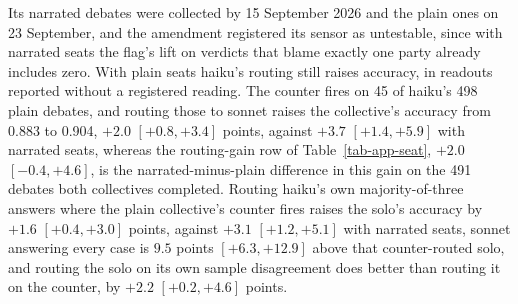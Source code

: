 Its narrated debates were collected by 15 September 2026 and the plain ones
on 23 September, and the amendment registered its sensor as untestable, since
with narrated seats the flag's lift on verdicts that blame exactly one party
already includes zero.
With plain seats haiku's routing still raises accuracy, in readouts reported
without a registered reading. The counter fires on 45 of haiku's 498 plain
debates, and routing those to sonnet raises the collective's accuracy from
0.883 to 0.904, $+2.0$ $[+0.8, +3.4]$ points, against $+3.7$
$[+1.4, +5.9]$ with narrated seats, whereas the routing-gain row of
Table~\ref{tab-app-seat}, $+2.0$ $[-0.4, +4.6]$, is the narrated-minus-plain
difference in this gain on the 491 debates both collectives completed.
Routing haiku's own majority-of-three answers where the plain collective's
counter fires raises the solo's accuracy by $+1.6$ $[+0.4, +3.0]$ points,
against $+3.1$ $[+1.2, +5.1]$ with narrated seats, sonnet answering every
case is $9.5$ points $[+6.3, +12.9]$ above that counter-routed solo, and
routing the solo on its own sample disagreement does better than routing it
on the counter, by $+2.2$ $[+0.2, +4.6]$ points.

